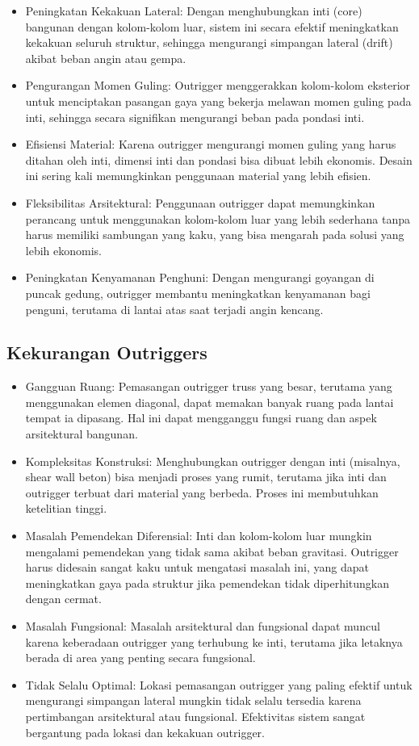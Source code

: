\documentclass[../modul_skb.tex]{subfiles}
\begin{document}
\begin{itemize}
	\item Peningkatan Kekakuan Lateral: Dengan menghubungkan inti (core) bangunan dengan kolom-kolom luar, sistem ini secara efektif meningkatkan kekakuan seluruh struktur, sehingga mengurangi simpangan lateral (drift) akibat beban angin atau gempa.
	\item Pengurangan Momen Guling: Outrigger menggerakkan kolom-kolom eksterior untuk menciptakan pasangan gaya yang bekerja melawan momen guling pada inti, sehingga secara signifikan mengurangi beban pada pondasi inti.
	\item Efisiensi Material: Karena outrigger mengurangi momen guling yang harus ditahan oleh inti, dimensi inti dan pondasi bisa dibuat lebih ekonomis. Desain ini sering kali memungkinkan penggunaan material yang lebih efisien.
	\item Fleksibilitas Arsitektural: Penggunaan outrigger dapat memungkinkan perancang untuk menggunakan kolom-kolom luar yang lebih sederhana tanpa harus memiliki sambungan yang kaku, yang bisa mengarah pada solusi yang lebih ekonomis.
	\item Peningkatan Kenyamanan Penghuni: Dengan mengurangi goyangan di puncak gedung, outrigger membantu meningkatkan kenyamanan bagi penguni, terutama di lantai atas saat terjadi angin kencang.
\end{itemize}

\subsection{Kekurangan Outriggers}%
\label{sub:Kekurangan Outriggers}

\begin{itemize}
	\item Gangguan Ruang: Pemasangan outrigger truss yang besar, terutama yang menggunakan elemen diagonal, dapat memakan banyak ruang pada lantai tempat ia dipasang. Hal ini dapat mengganggu fungsi ruang dan aspek arsitektural bangunan.
	\item Kompleksitas Konstruksi: Menghubungkan outrigger dengan inti (misalnya, shear wall beton) bisa menjadi proses yang rumit, terutama jika inti dan outrigger terbuat dari material yang berbeda. Proses ini membutuhkan ketelitian tinggi.
	\item Masalah Pemendekan Diferensial: Inti dan kolom-kolom luar mungkin mengalami pemendekan yang tidak sama akibat beban gravitasi. Outrigger harus didesain sangat kaku untuk mengatasi masalah ini, yang dapat meningkatkan gaya pada struktur jika pemendekan tidak diperhitungkan dengan cermat.
	\item Masalah Fungsional: Masalah arsitektural dan fungsional dapat muncul karena keberadaan outrigger yang terhubung ke inti, terutama jika letaknya berada di area yang penting secara fungsional.
	\item Tidak Selalu Optimal: Lokasi pemasangan outrigger yang paling efektif untuk mengurangi simpangan lateral mungkin tidak selalu tersedia karena pertimbangan arsitektural atau fungsional. Efektivitas sistem sangat bergantung pada lokasi dan kekakuan outrigger.
\end{itemize}
\end{document}

